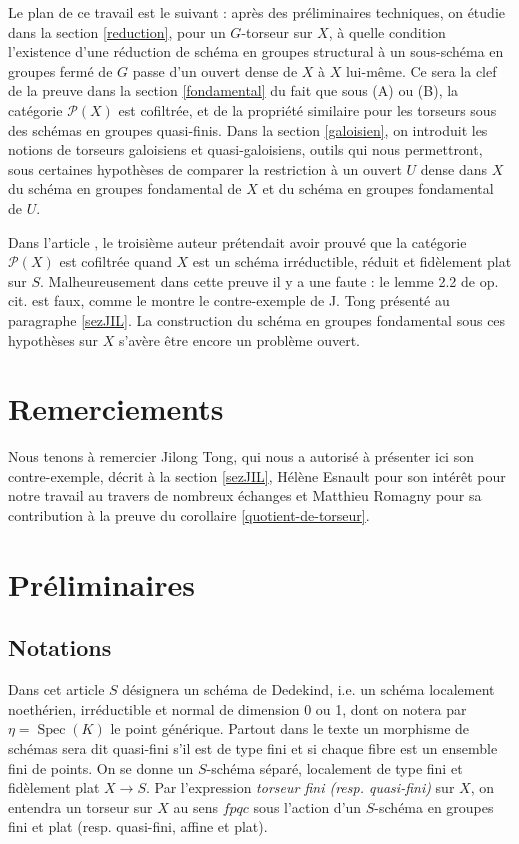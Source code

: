 \documentclass[11pt]{amsart}
\numberwithin{equation}{section}
\theoremstyle{definition}
\theoremstyle{remark}
\DeclareMathOperator{\Spec}{Spec}
\begin{document}
Le plan de ce travail est le suivant : apr\`es des pr\'eliminaires techniques, on \'etudie dans la section \ref{reduction}, pour un $G$-torseur sur $X$, \`a quelle condition l'existence d'une r\'eduction de sch\'ema en groupes structural \`a un sous-sch\'ema en groupes ferm\'e de $G$ passe d'un ouvert dense de $X$ \`a $X$ lui-m\^eme. Ce sera la clef de la preuve dans la section \ref{fondamental} du fait que sous (A) ou (B), la cat\'egorie $\mathcal{P} (X)$ est cofiltr\'ee, et de la propri\'et\'e similaire pour les torseurs sous des sch\'emas en groupes quasi-finis. Dans la section \ref{galoisien}, on introduit les notions de torseurs galoisiens et quasi-galoisiens, outils qui nous permettront, sous certaines hypoth\`eses de comparer la restriction \`a un ouvert $U$ dense dans $X$ du sch\'ema en groupes fondamental de $X$ et du sch\'ema en groupes fondamental de $U$.

Dans l'article \cite{GAS}, le troisi\`eme auteur pr\'etendait avoir prouv\'e que la cat\'egorie $\mathcal{P}(X)$ est cofiltr\'ee quand $X$ est un sch\'ema irr\'eductible, r\'eduit et fid\`element plat sur $S$. Malheureusement dans cette preuve il y a une faute : le lemme 2.2 de op. cit. est faux, comme le montre le contre-exemple de J. Tong pr\'esent\'e au paragraphe \ref{sezJIL}. La construction du sch\'ema en groupes fondamental sous ces hypoth\`eses sur $X$ s'av\`ere \^etre encore un probl\`eme ouvert.


\section*{Remerciements}
Nous tenons \`a remercier Jilong Tong, qui nous a autoris\'e \`a pr\'esenter ici son contre-exemple, d\'ecrit \`a la section \ref{sezJIL}, H\'el\`ene Esnault  pour son int\'er\^et pour notre travail au travers de nombreux \'echanges et Matthieu Romagny pour sa contribution \`a la preuve du corollaire \ref{quotient-de-torseur}.



\section{Pr\'eliminaires}
\label{Prel}

\subsection{Notations}

Dans cet article $S$ d\'esignera un sch\'ema de Dedekind, i.e. un sch\'ema localement noeth\'erien, irr\'eductible et normal de dimension 0 ou 1, dont on notera par $\eta=\Spec(K)$ le point g\'en\'erique. Partout dans le texte un morphisme de sch\'emas sera dit quasi-fini s'il est de type fini et si chaque fibre est un ensemble fini de points. On se donne un $S$-sch\'ema s\'epar\'e, localement de type fini et fid\`element plat $X\to S$. Par l'expression  \emph{torseur fini (resp. quasi-fini)} sur $X$, on entendra un torseur sur $X$ au sens $fpqc$ sous l'action d'un $S$-sch\'ema en groupes fini et plat (resp. quasi-fini, affine et plat).
\end{document}

